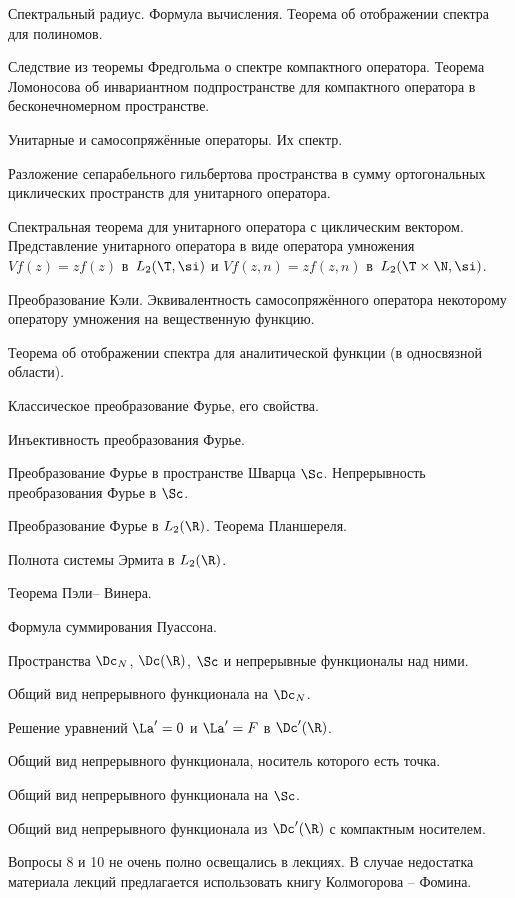 \documentclass[a4paper]{article}
\begin{document}
\begin{nums}{-2}
\item Спектральный радиус. Формула вычисления. Теорема об отображении спектра для полиномов.
\item Следствие из теоремы Фредгольма о спектре компактного оператора. Теорема Ломоносова
об инвариантном подпространстве для компактного оператора в бесконечномерном пространстве.
\item Унитарные и самосопряжённые операторы. Их спектр.
\item Разложение сепарабельного гильбертова пространства в сумму ортогональных циклических пространств
для унитарного оператора.
\item Спектральная теорема для унитарного оператора с циклическим вектором.
Представление унитарного оператора в виде оператора умножения
$V f(z) = z f(z)$ в~$L_2(\T,\si)$ и $V f(z,n) = z f(z,n)$  в~$L_2(\T\times\N, \si)$.
\item Преобразование Кэли. Эквивалентность самосопряжённого оператора некоторому оператору
умножения на вещественную функцию.
\item Теорема об отображении спектра для аналитической функции (в односвязной области).
\item Классическое преобразование Фурье, его свойства.
\item Инъективность преобразования Фурье.
\item Преобразование Фурье в пространстве Шварца $\Sc$. Непрерывность преобразования Фурье в $\Sc$.
\item Преобразование Фурье в $L_2(\R)$. Теорема Планшереля.
\item Полнота системы Эрмита в $L_2(\R)$.
\item Теорема Пэли-- Винера.
\item Формула суммирования Пуассона.
\item Пространства $\Dc_N$, $\Dc(\R)$, $\Sc$ и непрерывные функционалы над ними.
\item Общий вид непрерывного функционала на $\Dc_N$.
\item Решение уравнений $\La'=0$ и $\La'=F$ в $\Dc'(\R)$.
\item Общий вид непрерывного функционала, носитель которого есть точка.
\item Общий вид непрерывного функционала на $\Sc$.
\item Общий вид непрерывного функционала из $\Dc'(\R)$ с компактным носителем.
\end{nums}

\begin{note}
Вопросы 8 и 10 не очень полно освещались в лекциях. В случае недостатка
материала лекций предлагается использовать книгу Колмогорова -- Фомина.
\end{note}

\medskip\dmvntrail
\end{document}
